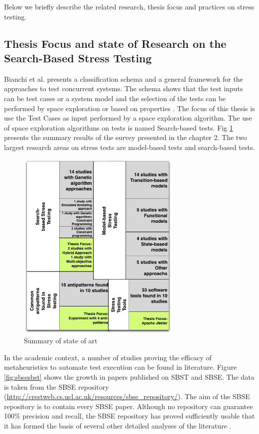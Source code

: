\documentclass{report}
\begin{document}
Below we briefly describe the related research, thesis focus and practices on stress testing.

\subsection{Thesis Focus and state of Research on the Search-Based Stress  Testing}

Bianchi et al. presents a classification schema and a general framework for the approaches to test concurrent systems. The schema shows that the test inputs can be  test cases or a system model and the selection of the tests can be performed by space exploration or based on properties \cite{Bianchi2017}. The focus of this thesis is use the Test Cases as input performed by a space exploration algorithm. The use of space exploration algorithms on tests is named Search-based tests. Fig \ref{fig:summary} presents the summary results of the survey presented in the chapter 2. The two largest research areas on stress tests are model-based tests and search-based tests.

\begin{figure}[h]
\centering
\includegraphics[width=0.7\textwidth]{./images/Summarysurvey.png}
\caption{Summary of state of art}
\label{fig:summary}
\end{figure}

In the academic context, a number of studies proving the efficacy of metaheuristics to automate test execution can be found in literature. Figure \ref{fig:sbsesbst}  shows the growth in papers published on SBST and SBSE. The data is taken from the SBSE repository (\url{http://crestweb.cs.ucl.ac.uk/resources/sbse_repository/}).
The aim of the SBSE repository is to contain every SBSE paper. Although no repository can guarantee 100\% precision and recall, the SBSE repository has proved sufficiently usable that it has formed the basis of several other detailed analyses of the literature \cite{Harman2015}.
\end{document}
